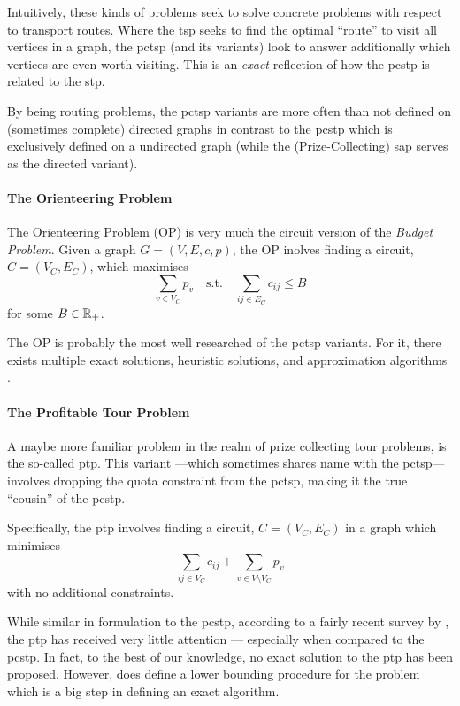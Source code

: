 Intuitively, these kinds of problems seek to solve concrete problems with respect to transport routes.
Where the \gls{tsp} seeks to find the optimal ``route'' to visit all vertices in
a graph, the \gls{pctsp} (and its variants) look to answer additionally
which vertices are even worth visiting.
This is an \textit{exact} reflection of how the \gls{pcstp} is related
to the \gls{stp}.

By being routing problems, the \gls{pctsp} variants are more often than not
defined on (sometimes complete) directed graphs in
contrast to the \gls{pcstp} which is exclusively
defined on a undirected graph (while the (Prize-Collecting)
\gls{sap} serves as the directed variant).

\paragraph{The Orienteering Problem}
The Orienteering Problem (OP) is very much the circuit version of the \textit{Budget Problem}.
Given a graph $G  = (V, E, c, p)$, the OP inolves finding a circuit, $C = (V_C, E_C)$,
which maximises
$$\sum_{v \in V_C}  p_v \quad \text{s.t.} \quad \sum_{ij \in E_C} c_{ij} \leq B$$
for some $B \in \mathbb{R}_+$.

The OP is probably the most well researched of the \gls{pctsp} variants. For it, there exists
multiple exact solutions, heuristic solutions, and approximation algorithms
\citep{archetti2014chapter}.

\paragraph{The Profitable Tour Problem}
A maybe more familiar problem in the realm of prize collecting tour problems, is the
so-called \gls{ptp}. This variant ---which sometimes shares name with
the \gls{pctsp}--- involves dropping the quota constraint from the \gls{pctsp},
making it the true ``cousin'' of the \gls{pcstp}.

 Specifically, the \gls{ptp} involves finding a circuit,
 $C = (V_C, E_C)$ in a graph which minimises
 $$\sum_{ij \in V_C} c_{ij} + \sum_{v \in V \setminus V_C} p_v$$
 with no additional constraints.
 
 While similar in formulation to the \gls{pcstp}, according to a fairly recent survey by
 \citet{archetti2014chapter}, the \gls{ptp} has received very little attention
 --- especially when compared to the \gls{pcstp}.
 In fact, to the best of our knowledge, no exact solution to the \gls{ptp}
 has been proposed.
 However, \citet{dell1995prize} does define a lower bounding procedure for the problem
 which is a big step in defining an exact algorithm.
 
